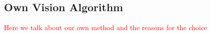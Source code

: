 \subsection{Own Vision Algorithm}
\textcolor{red}{Here we talk about our own method and the reasons for the choice}